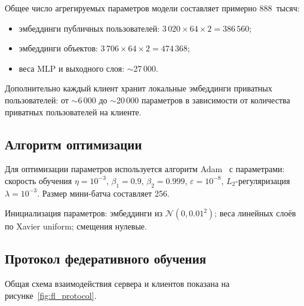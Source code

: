 \documentclass[14pt,a4paper]{extarticle}
\begin{document}
Общее число агрегируемых параметров модели составляет примерно 888~тысяч:
\begin{itemize}
  \item эмбеддинги публичных пользователей: $3\,020 \times 64 \times 2 = 386\,560$;
  \item эмбеддинги объектов: $3\,706 \times 64 \times 2 = 474\,368$;
  \item веса MLP и выходного слоя: $\sim$27\,000.
\end{itemize}
Дополнительно каждый клиент хранит локальные эмбеддинги приватных пользователей: от $\sim$6\,000 до $\sim$20\,000 параметров в зависимости от количества приватных пользователей на клиенте.


\subsection{Алгоритм оптимизации}

Для оптимизации параметров используется алгоритм Adam~\cite{kingma2015adam} с параметрами: скорость обучения $\eta = 10^{-3}$, $\beta_1 = 0.9$, $\beta_2 = 0.999$, $\varepsilon = 10^{-8}$, $L_2$-регуляризация $\lambda = 10^{-3}$. Размер мини-батча составляет 256.

Инициализация параметров: эмбеддинги из $\mathcal{N}(0, 0.01^2)$; веса линейных слоёв по Xavier uniform; смещения нулевые.


\subsection{Протокол федеративного обучения}

Общая схема взаимодействия сервера и клиентов показана на рисунке~\ref{fig:fl_protocol}.
\end{document}
